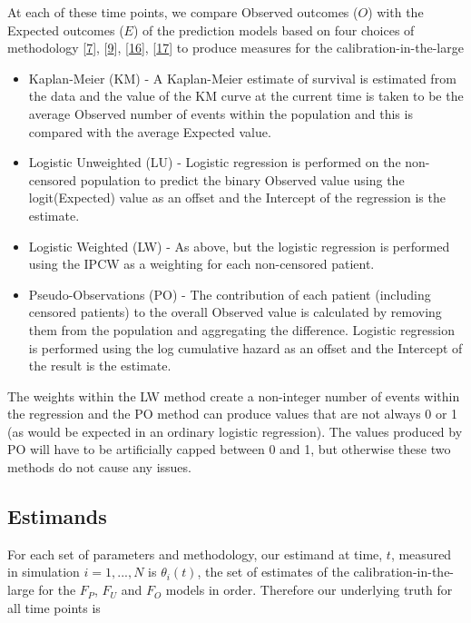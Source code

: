 \documentclass[12pt,PhD,twoside,openright]{muthesis}
\providecommand{\tightlist}{%
  \setlength{\itemsep}{0pt}\setlength{\parskip}{0pt}}
\begin{document}
At each of these time points, we compare Observed outcomes (\(O\)) with the Expected outcomes (\(E\)) of the prediction models based on four choices of methodology {[}\protect\hyperlink{ref-royston_tools_2014}{7}{]}, {[}\protect\hyperlink{ref-royston_tools_2015}{9}{]}, {[}\protect\hyperlink{ref-riley_prognosis_2019}{16}{]}, {[}\protect\hyperlink{ref-andersen_pseudo-observations_2010}{17}{]} to produce measures for the calibration-in-the-large
\begin{itemize}
\tightlist
\item
  Kaplan-Meier (KM) - A Kaplan-Meier estimate of survival is estimated from the data and the value of the KM curve at the current time is taken to be the average Observed number of events within the population and this is compared with the average Expected value.
\item
  Logistic Unweighted (LU) - Logistic regression is performed on the non-censored population to predict the binary Observed value using the logit(Expected) value as an offset and the Intercept of the regression is the estimate.
\item
  Logistic Weighted (LW) - As above, but the logistic regression is performed using the IPCW as a weighting for each non-censored patient.
\item
  Pseudo-Observations (PO) - The contribution of each patient (including censored patients) to the overall Observed value is calculated by removing them from the population and aggregating the difference. Logistic regression is performed using the log cumulative hazard as an offset and the Intercept of the result is the estimate.
\end{itemize}
The weights within the LW method create a non-integer number of events within the regression and the PO method can produce values that are not always 0 or 1 (as would be expected in an ordinary logistic regression). The values produced by PO will have to be artificially capped between 0 and 1, but otherwise these two methods do not cause any issues.

\hypertarget{estimands}{%
\subsection{Estimands}\label{estimands}}

For each set of parameters and methodology, our estimand at time, \(t\), measured in simulation \(i = 1,...,N\) is \(\theta_i(t)\), the set of estimates of the calibration-in-the-large for the \(F_P\), \(F_U\) and \(F_O\) models in order. Therefore our underlying truth for all time points is
\end{document}
